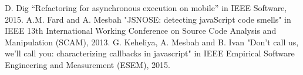 \documentclass[10pt,conference]{IEEEtran}
\begin{document}
\begin{thebibliography}{00}
 D. Dig ``Refactoring for asynchronous execution on mobile'' in IEEE Software, 2015.
 A.M. Fard and A. Mesbah "JSNOSE: detecting javaScript code smells" in IEEE 13th International Working Conference on Source Code Analysis and Manipulation (SCAM), 2013.
 G. Keheliya, A. Mesbah and B. Ivan "Don't call us, we'll call you: characterizing callbacks in javascript" in IEEE Empirical Software Engineering and Measurement (ESEM), 2015.
\end{thebibliography}
\end{document}
